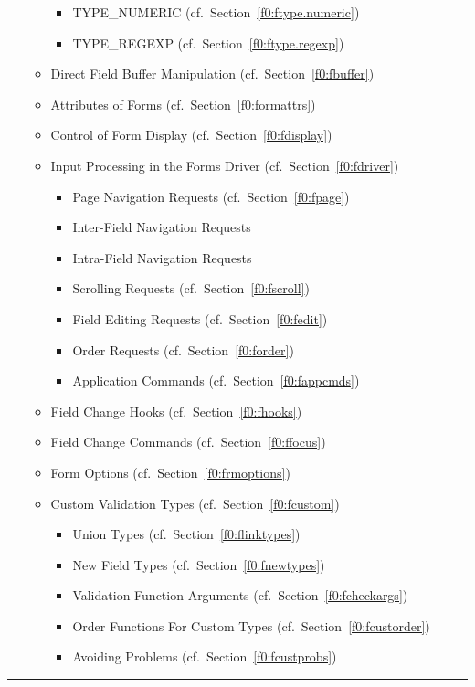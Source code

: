 \begin{itemize}
\begin{itemize}
\begin{itemize}
\item TYPE\_NUMERIC (cf.\ Section~\ref{f0:ftype.numeric})
\item TYPE\_REGEXP (cf.\ Section~\ref{f0:ftype.regexp})
\end{itemize}
\item Direct Field Buffer Manipulation (cf.\ Section~\ref{f0:fbuffer})
\item Attributes of Forms (cf.\ Section~\ref{f0:formattrs})
\item Control of Form Display (cf.\ Section~\ref{f0:fdisplay})
\item Input Processing in the Forms Driver (cf.\ Section~\ref{f0:fdriver})
\begin{itemize}
\item Page Navigation Requests (cf.\ Section~\ref{f0:fpage})
\item Inter-Field Navigation Requests
\item Intra-Field Navigation Requests
\item Scrolling Requests (cf.\ Section~\ref{f0:fscroll})
\item Field Editing Requests (cf.\ Section~\ref{f0:fedit})
\item Order Requests (cf.\ Section~\ref{f0:forder})
\item Application Commands (cf.\ Section~\ref{f0:fappcmds})
\end{itemize}
\item Field Change Hooks (cf.\ Section~\ref{f0:fhooks})
\item Field Change Commands (cf.\ Section~\ref{f0:ffocus})
\item Form Options (cf.\ Section~\ref{f0:frmoptions})
\item Custom Validation Types (cf.\ Section~\ref{f0:fcustom})
\begin{itemize}
\item Union Types (cf.\ Section~\ref{f0:flinktypes})
\item New Field Types (cf.\ Section~\ref{f0:fnewtypes})
\item Validation Function Arguments (cf.\ Section~\ref{f0:fcheckargs})
\item Order Functions For Custom Types (cf.\ Section~\ref{f0:fcustorder})
\item Avoiding Problems (cf.\ Section~\ref{f0:fcustprobs})
\end{itemize}
\end{itemize}
\end{itemize}
\vspace{1mm}\hrule 
